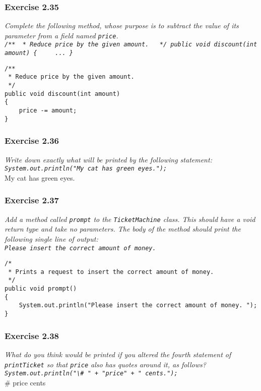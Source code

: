 \subsubsection*{Exercise 2.35}
\textit{Complete the following method, whose purpose is to subtract the value 
of its parameter from a field named \lstinline?price?. \\
\lstinline?/**
 * Reduce price by the given amount. 
 */
public void discount(int amount)
{
    ...
}?}\\
\begin{lstlisting}
/**
 * Reduce price by the given amount. 
 */
public void discount(int amount)
{
	price -= amount;
}
\end{lstlisting}

\subsubsection*{Exercise 2.36}
\textit{Write down exactly what will be printed by the following statement: \\
\lstinline?System.out.println("My cat has green eyes.");?}\\
My cat has green eyes. 

\subsubsection*{Exercise 2.37}
\textit{Add a method called \lstinline?prompt? to the \lstinline?TicketMachine? 
class. This should have a void return type and take no parameters. The body of 
the method should print the following single line of output: \\
\lstinline?Please insert the correct amount of money. ?}\\
\begin{lstlisting}
/* 
 * Prints a request to insert the correct amount of money. 
 */
public void prompt()
{
	System.out.println("Please insert the correct amount of money. ");
}
\end{lstlisting}

\subsubsection*{Exercise 2.38}
\textit{What do you think would be printed if you altered the fourth statement 
of \lstinline?printTicket? so that \lstinline?price? also has quotes around it, 
as follows? \\
\lstinline?System.out.println("\# " + "price" + " cents.");?}\\
\# price cents

